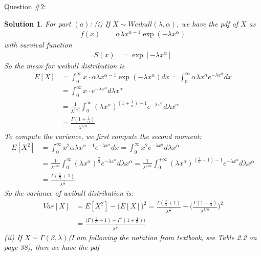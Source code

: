 \documentclass[11pt]{article}
\newtheorem{sol}{Solution}
\begin{document}
Question $\#2$:
\begin{sol}
	For part $(a)$:\vskip 2mm
	(i) If $X \sim Weibull(\lambda, \alpha)$, we have the pdf of $X$ as
	\begin{align*}
		f(x) &= \alpha\lambda x^{\alpha - 1}\exp(-\lambda x^{\alpha})
	\end{align*}
	with survival function
	\begin{align*}
		S(x) &= \exp[-\lambda x^{\alpha}]
	\end{align*}
	So the mean for weibull distribution is
	\begin{align*}
		E[X] &= \int_0^{\infty}x \cdot \alpha\lambda x^{\alpha - 1}\exp(-\lambda x^{\alpha})d x = \int_0^{\infty} \alpha\lambda x^{\alpha}e^{-\lambda x^{\alpha}}d x\\
		&=  \int_0^{\infty}x\cdot e^{-\lambda x^{\alpha}}d \lambda x^{\alpha}\\
		&= \frac{1}{\lambda^{1/\alpha}}\int_0^{\infty}(\lambda x^{\alpha})^{(1 + \frac{1}{\alpha}) - 1}e^{-\lambda x^{\alpha}}d \lambda x^{\alpha}\\
		&= \frac{\Gamma(1 + \frac{1}{\alpha})}{\lambda^{1/\alpha}}
			\end{align*}
	To compute the variance, we first compute the second moment:
	\begin{align*}
		E[X^2] &= \int_0^{\infty}x^2 \alpha\lambda x^{\alpha - 1}e^{-\lambda x^{\alpha}}d x = \int_0^{\infty}x^2e^{-\lambda x^{\alpha}}d \lambda x^{\alpha}\\
		&= \frac{1}{\lambda^{2/\alpha}}\int_0^{\infty}(\lambda x^{\alpha})^{\frac{2}{\alpha}}e^{-\lambda x^{\alpha}}d\lambda x^{\alpha}= \frac{1}{\lambda^{2/\alpha}}\int_0^{+\infty}(\lambda x^{\alpha})^{(\frac{2}{\alpha} + 1) - 1}e^{-\lambda x^{\alpha}}d\lambda x^{\alpha}\\
		&= \frac{\Gamma(\frac{2}{\alpha} + 1)}{\lambda^{\frac{2}{\alpha}}}
	\end{align*}
	So the variance of weibull distribution is:
	\begin{align*}
		Var[X] &= E[X^2] - \Big(E[X]\Big)^2 =  \frac{\Gamma(\frac{2}{\alpha} + 1)}{\lambda^{\frac{2}{\alpha}}} - \Big(\frac{\Gamma(1 + \frac{1}{\alpha})}{\lambda^{1/\alpha}}\Big)^2\\
		&= \frac{\Big(\Gamma(\frac{2}{\alpha} + 1) - \Gamma^2(1 + \frac{1}{\alpha})\Big)}{\lambda^{\frac{2}{\alpha}}}
	\end{align*}
	(ii) If $X \sim \Gamma(\beta, \lambda)$(I am following the notation from textbook, see Table 2.2 on page 38), then we have the pdf
	\begin{align*}

\end{align*}
\end{sol}
\end{document}

